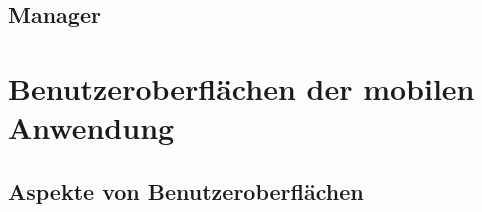 \documentclass[11pt,a4paper]{article}
\begin{document}
\subsection{Manager}	

%
%
%
%

\clearpage
\section{Benutzeroberflächen der mobilen Anwendung}
\label{sec:UI-allgemein}

\subsection{Aspekte von Benutzeroberflächen}
\label{sec:UI-Aspekte}

\end{document}
